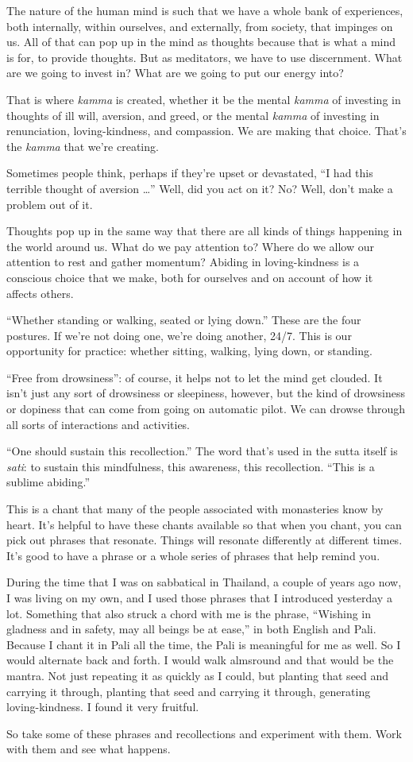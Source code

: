 The nature of the human mind is such that we have a whole bank of
experiences, both internally, within ourselves, and externally, from
society, that impinges on us. All of that can pop up in the mind as
thoughts because that is what a mind is for, to provide thoughts. But as
meditators, we have to use discernment. What are we going to invest in?
What are we going to put our energy into?

That is where \emph{kamma} is created, whether it be the mental
\emph{kamma} of investing in thoughts of ill will, aversion, and greed,
or the mental \emph{kamma} of investing in renunciation,
loving-kindness, and compassion. We are making that choice. That’s the
\emph{kamma} that we’re creating.

Sometimes people think, perhaps if they’re upset or devastated, “I had
this terrible thought of aversion \ldots{}” Well, did you act on it? No?
Well, don’t make a problem out of it.

Thoughts pop up in the same way that there are all kinds of things
happening in the world around us. What do we pay attention to? Where do
we allow our attention to rest and gather momentum? Abiding in
loving-kindness is a conscious choice that we make, both for ourselves
and on account of how it affects others.

“Whether standing or walking, seated or lying down.” These are the four
postures. If we’re not doing one, we’re doing another, 24/7. This is our
opportunity for practice: whether sitting, walking, lying down, or
standing.

“Free from drowsiness”: of course, it helps not to let the mind get
clouded. It isn’t just any sort of drowsiness or sleepiness, however,
but the kind of drowsiness or dopiness that can come from going on
automatic pilot. We can drowse through all sorts of interactions and
activities.

“One should sustain this recollection.” The word that’s used in the
sutta itself is \emph{sati}: to sustain this mindfulness, this
awareness, this recollection. “This is a sublime abiding.”

This is a chant that many of the people associated with monasteries know
by heart. It’s helpful to have these chants available so that when you
chant, you can pick out phrases that resonate. Things will resonate
differently at different times. It’s good to have a phrase or a whole
series of phrases that help remind you.

During the time that I was on sabbatical in Thailand, a couple of years
ago now, I was living on my own, and I used those phrases that I
introduced yesterday a lot. Something that also struck a chord with me
is the phrase, “Wishing in gladness and in safety, may all beings be at
ease,” in both English and Pali. Because I chant it in Pali all the
time, the Pali is meaningful for me as well. So I would alternate back
and forth. I would walk almsround and that would be the mantra. Not just
repeating it as quickly as I could, but planting that seed and carrying
it through, planting that seed and carrying it through, generating
loving-kindness. I found it very fruitful.

So take some of these phrases and recollections and experiment with
them. Work with them and see what happens.
